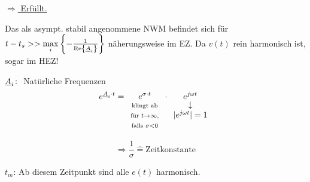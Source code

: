 \begin{enumerate}[label= \bfseries\alph*)]
\begin{itemize}
        \underline{$\Rightarrow$ Erfüllt.}
        
        Das als asympt. stabil angenommene \acs{NWM} befindet sich für\\
        $t-t_s>>\underset{i}{\operatorname{max}}
          \left\{-\frac{1}{\operatorname{Re}\left\{\underline{A}_i\right\}}\right\}$ näherungsweise im EZ.
          Da $v(t)$ rein harmonisch ist, sogar im \acs{HEZ}!
    \end{itemize}\medskip

  \begin{minipage}{0.5\textwidth}
    $\underline{A}_i\colon$ Natürliche Frequenzen
    \[e^{\underline{A}_i\cdot t} = \underset{
        \begin{array}{c}
          \scriptstyle\text{klingt ab}\\
          \scriptstyle\text{für }t\to\infty,\\
          \scriptstyle\text{falls }\sigma<0
        \end{array}}{
      e^{\sigma\cdot t}} \cdot \underset{
        \begin{array}{c}
          \downarrow\\
          |e^{j\omega t}|=1
        \end{array}}
    {e^{j\omega t}}\]
  \end{minipage}
  \begin{minipage}{0.5\textwidth}
    \[\Rightarrow \frac{1}{\sigma}\mathrel{\widehat{=}} \text{Zeitkonstante}\]
    
    $t_m$: Ab diesem Zeitpunkt sind alle $e(t)$ harmonisch.
  \end{minipage}

\end{enumerate}


